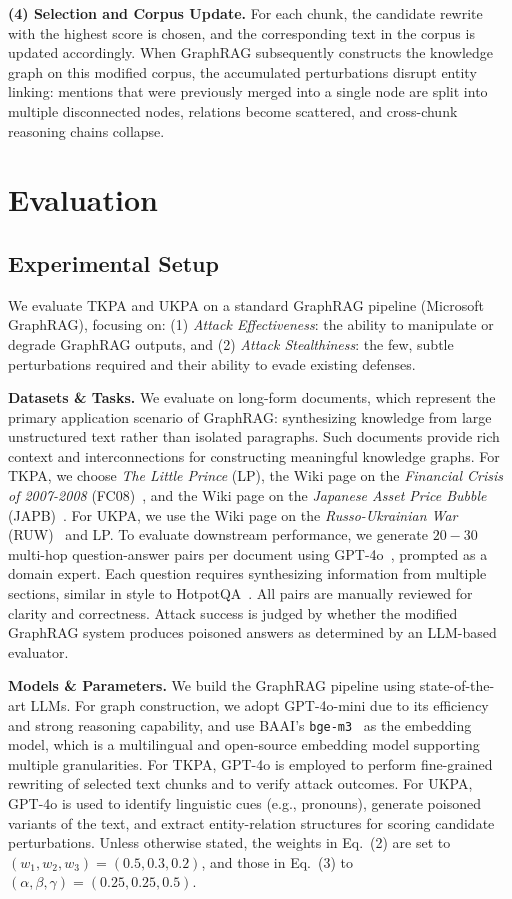 \documentclass[letterpaper]{article} %
\begin{document}
\textbf{(4) Selection and Corpus Update.}
For each chunk, the candidate rewrite with the highest score is chosen,
and the corresponding text in the corpus is updated accordingly.
When GraphRAG subsequently constructs the knowledge graph on this modified corpus,
the accumulated perturbations disrupt entity linking:
mentions that were previously merged into a single node are split into multiple disconnected nodes,
relations become scattered, and cross-chunk reasoning chains collapse.


\section{Evaluation}

\subsection{Experimental Setup}
We evaluate TKPA and UKPA on a standard GraphRAG pipeline (Microsoft GraphRAG), focusing on:
(1) \emph{Attack Effectiveness}: the ability to manipulate or degrade GraphRAG outputs, and 
(2) \emph{Attack Stealthiness}: the few, subtle perturbations required and their ability to evade existing defenses.


\textbf{Datasets \& Tasks.}
We evaluate on long-form documents, which represent the primary application scenario of GraphRAG: synthesizing knowledge from large unstructured text rather than isolated paragraphs. Such documents provide rich context and interconnections for constructing meaningful knowledge graphs.
For TKPA, we choose \textit{The Little Prince} (LP), the Wiki page on the \textit{Financial Crisis of 2007-2008} (FC08)~\cite{wiki:financial_crisis_2008}, and the Wiki page on the \textit{Japanese Asset Price Bubble} (JAPB)~\cite{wiki:jp_bubble}.
For UKPA, we use the Wiki page on the \textit{Russo-Ukrainian War} (RUW)~\cite{wiki:rus_ukr_war} and LP.
To evaluate downstream performance, we generate $20-30$ multi-hop question-answer pairs per document using GPT-4o~\cite{OpenAI2024}, prompted as a domain expert. 
Each question requires synthesizing information from multiple sections, similar in style to HotpotQA~\cite{yang2018hotpotqa}.
All pairs are manually reviewed for clarity and correctness. 
Attack success is judged by whether the modified GraphRAG system produces poisoned answers as determined by an LLM-based evaluator.

\textbf{Models \& Parameters.}
We build the GraphRAG pipeline using state-of-the-art LLMs. 
For graph construction, we adopt GPT-4o-mini due to its efficiency and strong reasoning capability, 
and use BAAI's \texttt{bge-m3}~\cite{DBLP:journals/corr/abs-2402-03216} as the embedding model, which is a multilingual and open-source embedding model supporting multiple granularities.
For TKPA, GPT-4o is employed to perform fine-grained rewriting of selected text chunks and to verify attack outcomes. 
For UKPA, GPT-4o is used to identify linguistic cues (e.g., pronouns), generate poisoned variants of the text, 
and extract entity-relation structures for scoring candidate perturbations. Unless otherwise stated, the weights in Eq.~(2) are set to $(w_1,w_2,w_3) = (0.5, 0.3, 0.2)$,
and those in Eq.~(3) to $(\alpha,\beta,\gamma) = (0.25, 0.25, 0.5)$.
\end{document}

